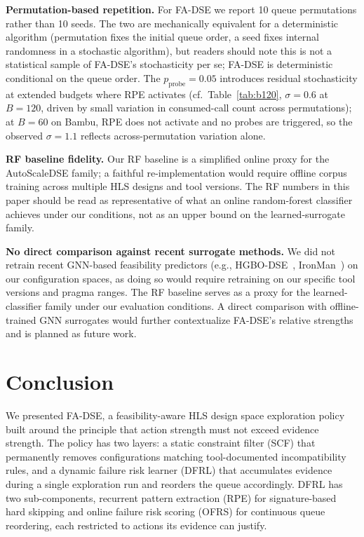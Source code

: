 \documentclass[journal]{IEEEtran}
\begin{document}
\textbf{Permutation-based repetition.} For FA-DSE we report 10 queue permutations rather than 10 seeds. The two are mechanically equivalent for a deterministic algorithm (permutation fixes the initial queue order, a seed fixes internal randomness in a stochastic algorithm), but readers should note this is not a statistical sample of FA-DSE's stochasticity per se; FA-DSE is deterministic conditional on the queue order. The $p_{\text{probe}}{=}0.05$ introduces residual stochasticity at extended budgets where RPE activates (cf.\ Table~\ref{tab:b120}, $\sigma{=}0.6$ at $B{=}120$, driven by small variation in consumed-call count across permutations); at $B{=}60$ on Bambu, RPE does not activate and no probes are triggered, so the observed $\sigma{=}1.1$ reflects across-permutation variation alone.

\textbf{RF baseline fidelity.} Our RF baseline is a simplified online proxy for the AutoScaleDSE family; a faithful re-implementation would require offline corpus training across multiple HLS designs and tool versions. The RF numbers in this paper should be read as representative of what an online random-forest classifier achieves under our conditions, not as an upper bound on the learned-surrogate family.

\textbf{No direct comparison against recent surrogate methods.} We did not retrain recent GNN-based feasibility predictors (e.g., HGBO-DSE~\cite{kuang2023hgbo}, IronMan~\cite{wu2021ironman}) on our configuration spaces, as doing so would require retraining on our specific tool versions and pragma ranges. The RF baseline serves as a proxy for the learned-classifier family under our evaluation conditions. A direct comparison with offline-trained GNN surrogates would further contextualize FA-DSE's relative strengths and is planned as future work.


\section{Conclusion}
\label{sec:conclusion}

We presented FA-DSE, a feasibility-aware HLS design space exploration policy built around the principle that action strength must not exceed evidence strength. The policy has two layers: a static constraint filter (SCF) that permanently removes configurations matching tool-documented incompatibility rules, and a dynamic failure risk learner (DFRL) that accumulates evidence during a single exploration run and reorders the queue accordingly. DFRL has two sub-components, recurrent pattern extraction (RPE) for signature-based hard skipping and online failure risk scoring (OFRS) for continuous queue reordering, each restricted to actions its evidence can justify.
\end{document}
